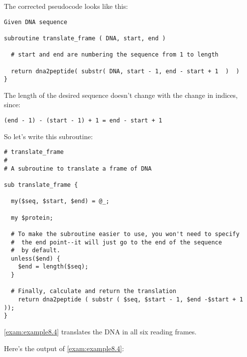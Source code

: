 The corrected pseudocode looks like this:

\begin{lstlisting}
Given DNA sequence

subroutine translate_frame ( DNA, start, end )

  # start and end are numbering the sequence from 1 to length

  return dna2peptide( substr( DNA, start - 1, end - start + 1  )  )
}
\end{lstlisting}

The length of the desired sequence doesn't change with the change in indices, since:

\begin{lstlisting}
(end - 1) - (start - 1) + 1 = end - start + 1
\end{lstlisting}

So let's write this subroutine:

\begin{lstlisting}
# translate_frame
#
# A subroutine to translate a frame of DNA

sub translate_frame {

  my($seq, $start, $end) = @_;

  my $protein;

  # To make the subroutine easier to use, you won't need to specify
  #  the end point--it will just go to the end of the sequence
  #  by default.
  unless($end) {
    $end = length($seq);
  }

  # Finally, calculate and return the translation
    return dna2peptide ( substr ( $seq, $start - 1, $end -$start + 1 ));
}
\end{lstlisting}

\autoref{exam:example8.4} translates the DNA in all six reading frames. 



Here's the output of \autoref{exam:example8.4}:

